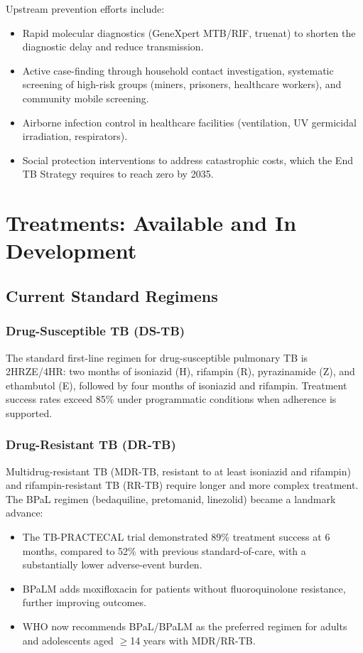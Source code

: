 \documentclass[11pt]{article}
\begin{document}
Upstream prevention efforts include:
\begin{itemize}
  \item Rapid molecular diagnostics (GeneXpert MTB/RIF, truenat) to shorten the diagnostic delay and reduce transmission.
  \item Active case-finding through household contact investigation, systematic screening of high-risk groups (miners, prisoners, healthcare workers), and community mobile screening.
  \item Airborne infection control in healthcare facilities (ventilation, UV germicidal irradiation, respirators).
  \item Social protection interventions to address catastrophic costs, which the End TB Strategy requires to reach zero by 2035.
\end{itemize}

\section{Treatments: Available and In Development}
\label{sec:treatment}

\subsection{Current Standard Regimens}

\subsubsection{Drug-Susceptible TB (DS-TB)}

The standard first-line regimen for drug-susceptible pulmonary TB is 2HRZE/4HR: two months of isoniazid (H), rifampin (R), pyrazinamide (Z), and ethambutol (E), followed by four months of isoniazid and rifampin. Treatment success rates exceed 85\% under programmatic conditions when adherence is supported.

\subsubsection{Drug-Resistant TB (DR-TB)}

Multidrug-resistant TB (MDR-TB, resistant to at least isoniazid and rifampin) and rifampin-resistant TB (RR-TB) require longer and more complex treatment. The BPaL regimen (bedaquiline, pretomanid, linezolid) became a landmark advance:
\begin{itemize}
  \item The TB-PRACTECAL trial demonstrated 89\% treatment success at 6 months, compared to 52\% with previous standard-of-care, with a substantially lower adverse-event burden.
  \item BPaLM adds moxifloxacin for patients without fluoroquinolone resistance, further improving outcomes.
  \item WHO now recommends BPaL/BPaLM as the preferred regimen for adults and adolescents aged $\geq$14 years with MDR/RR-TB.
\end{itemize}
\end{document}
